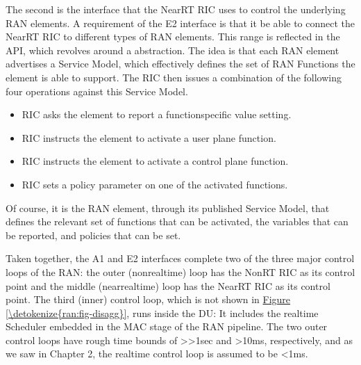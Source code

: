 \documentclass[a4paper,11pt,english]{sphinxmanual}
\begin{document}
\sphinxAtStartPar
The second is the  interface that the Near\sphinxhyphen{}RT RIC uses to
control the underlying RAN elements. A requirement of the E2 interface
is that it be able to connect the Near\sphinxhyphen{}RT RIC to different types of
RAN elements. This range is reflected in the API, which revolves
around a  abstraction. The idea is that each RAN
element advertises a Service Model, which effectively defines the set
of RAN Functions the element is able to support. The RIC then issues a
combination of the following four operations against this Service
Model.
\begin{itemize}
\item {} 
\sphinxAtStartPar
{} RIC asks the element to report a function\sphinxhyphen{}specific value setting.

\item {} 
\sphinxAtStartPar
{} RIC instructs the element to activate a user plane function.

\item {} 
\sphinxAtStartPar
{} RIC instructs the element to activate a control plane function.

\item {} 
\sphinxAtStartPar
{} RIC sets a policy parameter on one of the activated functions.

\end{itemize}

\sphinxAtStartPar
Of course, it is the RAN element, through its published Service Model,
that defines the relevant set of functions that can be activated, the
variables that can be reported, and policies that can be set.

\sphinxAtStartPar
Taken together, the A1 and E2 interfaces complete two of the three
major control loops of the RAN: the outer (non\sphinxhyphen{}real\sphinxhyphen{}time) loop has the
Non\sphinxhyphen{}RT RIC as its control point and the middle (near\sphinxhyphen{}real\sphinxhyphen{}time) loop has
the Near\sphinxhyphen{}RT RIC as its control point. The third (inner) control loop,
which is not shown in \hyperref[\detokenize{ran:fig-disagg}]{Figure \ref{\detokenize{ran:fig-disagg}}}, runs inside
the DU: It includes the real\sphinxhyphen{}time Scheduler embedded in the MAC stage
of the RAN pipeline. The two outer control loops have rough time
bounds of \textgreater{}\textgreater{}1sec and \textgreater{}10ms, respectively, and as we saw in Chapter 2,
the real\sphinxhyphen{}time control loop is assumed to be \textless{}1ms.
\end{document}
